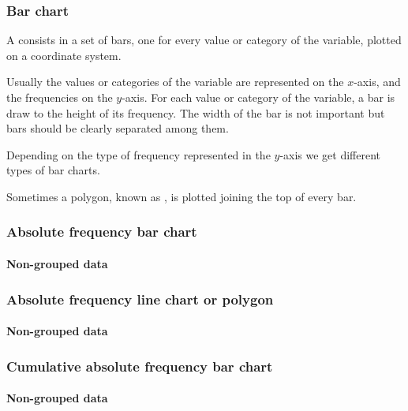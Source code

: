 \begin{frame}
\frametitle{Bar chart}
A  consists in a set of bars, one for every value or category of the variable, plotted on a
coordinate system.

Usually the values or categories of the variable are represented on the $x$-axis, and the frequencies on the $y$-axis. 
For each value or category of the variable, a bar is draw to the height of its frequency.
The width of the bar is not important but bars should be clearly separated among them. 

Depending on the type of frequency represented in the $y$-axis we get different types of bar charts.
 
Sometimes a polygon, known as , is plotted joining the top of every bar.
\end{frame}



\begin{frame}
\frametitle{Absolute frequency bar chart}
\framesubtitle{Non-grouped data}
\begin{center}
\scalebox{0.6}{} 
\end{center}
\end{frame}


\begin{frame}
\frametitle{Absolute frequency line chart or polygon}
\framesubtitle{Non-grouped data}
\begin{center}
\scalebox{0.6}{} 
\end{center}
\end{frame}


\begin{frame}
\frametitle{Cumulative absolute frequency bar chart}
\framesubtitle{Non-grouped data}
\begin{center}
\scalebox{0.6}{} 
\end{center}
\end{frame}


